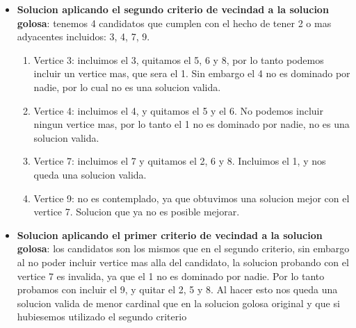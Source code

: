 \begin{itemize}
{}

    
    \item \textbf{Solucion aplicando el segundo criterio de vecindad a la solucion golosa}: tenemos 4 candidatos que cumplen con el hecho de tener 2 o mas adyacentes incluidos: 3, 4, 7, 9.
    \begin{enumerate}
    	\item Vertice 3: incluimos el 3, quitamos el 5, 6 y 8, por lo tanto podemos incluir un vertice mas, que sera el 1. Sin embargo el 4 no es dominado por nadie, por lo cual no es una solucion valida.
        \item Vertice 4: incluimos el 4, y quitamos el 5 y el 6. No podemos incluir ningun vertice mas, por lo tanto el 1 no es dominado por nadie, no es una solucion valida.
        \item Vertice 7: incluimos el 7 y quitamos el 2, 6 y 8. Incluimos el 1, y nos queda una solucion valida.
        \item Vertice 9: no es contemplado, ya que obtuvimos una solucion mejor con el vertice 7. Solucion que ya no es posible mejorar.
	\end{enumerate}
    
    
    \item \textbf{Solucion aplicando el primer criterio de vecindad a la solucion golosa}: los candidatos son los mismos que en el segundo criterio, sin embargo al no poder incluir vertice mas alla del candidato, la solucion probando con el vertice 7 es invalida, ya que el 1 no es dominado por nadie. Por lo tanto probamos con incluir el 9, y quitar el 2, 5 y 8. Al hacer esto nos queda una solucion valida de menor cardinal que en la solucion golosa original y que si hubiesemos utilizado el segundo criterio




\end{itemize}
